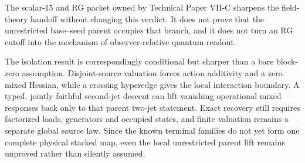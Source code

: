 \documentclass[11pt]{article}
\begin{document}
The scalar-15 and RG packet owned by Technical Paper VII-C sharpens the
field-theory handoff without changing this verdict. It does not prove that the
unrestricted base--seed parent occupies that branch, and it does not turn an
RG cutoff into the mechanism of observer-relative quantum readout.

The isolation result is correspondingly conditional but sharper than a bare
block-zero assumption. Disjoint-source valuation forces action additivity and
a zero mixed Hessian, while a crossing hyperedge gives the local interaction
boundary. A typed, jointly faithful second-jet descent can lift vanishing
operational mixed responses back only to that parent two-jet statement. Exact
recovery still requires factorized loads, generators and occupied states, and
finite valuation remains a separate global source law. Since the known
terminal families do not yet form one complete physical stacked map, even the
local unrestricted parent lift remains unproved rather than silently assumed.

\FloatBarrier



\end{document}
